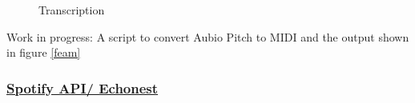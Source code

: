 \begin{figure}[htbp]
	\centering
	\caption{Transcription}
	\label{fig:transc}
\end{figure}
\FloatBarrier

Work in progress: A script to convert Aubio Pitch to MIDI and the output shown in figure \ref{feam}

\subsubsection{\underline{Spotify API/ Echonest}}\label{spotipy}

